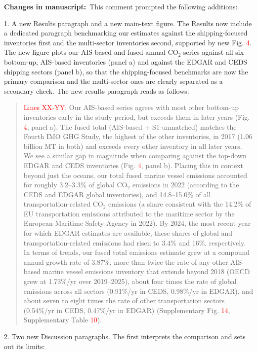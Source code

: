 \documentclass[11pt]{article}
\newcommand{\changes}{\par\medskip\noindent%
  \textbf{\textcolor{changegreen}{Changes in manuscript:}}\ }
\begin{document}
\changes This comment prompted the following additions:

1. A new Results paragraph and a new main-text figure. The Results now include a dedicated paragraph benchmarking our estimates against the shipping-focused inventories first and the multi-sector inventories second, supported by new Fig. \textcolor{red}{4}. The new figure plots our AIS-based and fused annual CO$_{2}$ series against all six bottom-up, AIS-based inventories (panel a) and against the EDGAR and CEDS shipping sectors (panel b), so that the shipping-focused benchmarks are now the primary comparison and the multi-sector ones are clearly separated as a secondary check. The new results paragraph reads as follows:


\begin{quote}
\textcolor{red}{Lines XX-YY}: Our AIS-based series agrees with most other bottom-up inventories early in the study period, but exceeds them in later years (Fig. \textcolor{red}{4}, panel a). The fused total (AIS-based + S1-unmatched) matches the Fourth IMO GHG Study, the highest of the other inventories, in 2017 (1.06 billion MT in both) and exceeds every other inventory in all later years. We see a similar gap in magnitude when comparing against the top-down EDGAR and CEDS inventories (Fig. \textcolor{red}{4}, panel b). Placing this in context beyond just the oceans, our total fused marine vessel emissions accounted for roughly 3.2--3.3\% of global CO$_{2}$ emissions in 2022 (according to the CEDS and EDGAR global inventories), and 14.8--15.0\% of all transportation-related CO$_{2}$ emissions (a share consistent with the 14.2\% of EU transportation emissions attributed to the maritime sector by the European Maritime Safety Agency in 2022). By 2024, the most recent year for which EDGAR estimates are available, these shares of global and transportation-related emissions had risen to 3.4\% and 16\%, respectively. In terms of trends, our fused total emissions estimate grew at a compound annual growth rate of 3.87\%, more than twice the rate of any other AIS-based marine vessel emissions inventory that extends beyond 2018 (OECD grew at 1.73\%/yr over 2019--2025), about four times the rate of global emissions across all sectors (0.91\%/yr in CEDS, 0.98\%/yr in EDGAR), and about seven to eight times the rate of other transportation sectors (0.54\%/yr in CEDS, 0.47\%/yr in EDGAR) (Supplementary Fig. \textcolor{red}{14}, Supplementary Table \textcolor{red}{10}).
\end{quote}

2. Two new Discussion paragraphs. The first interprets the comparison and sets out its limits:
\end{document}

